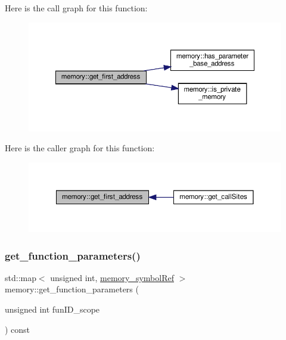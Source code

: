 Here is the call graph for this function\+:
\nopagebreak
\begin{figure}[H]
\begin{center}
\leavevmode
\includegraphics[width=350pt]{d8/d99/classmemory_a8288dc9efc8050b3d34cb06b74a1d3db_cgraph}
\end{center}
\end{figure}
Here is the caller graph for this function\+:
\nopagebreak
\begin{figure}[H]
\begin{center}
\leavevmode
\includegraphics[width=350pt]{d8/d99/classmemory_a8288dc9efc8050b3d34cb06b74a1d3db_icgraph}
\end{center}
\end{figure}
\mbox{\label{classmemory_a5d64e7ff7e95efad54bbfa07f58e18c1}} 
\subsubsection{\texorpdfstring{get\+\_\+function\+\_\+parameters()}{get\_function\_parameters()}}
{\footnotesize\ttfamily std\+::map$<$ unsigned int, \hyperlink{memory__symbol_8hpp_af3608dbc27177447c2d777fa712cc82a}{memory\+\_\+symbol\+Ref} $>$ memory\+::get\+\_\+function\+\_\+parameters (\begin{DoxyParamCaption}\item[{unsigned int}]{fun\+I\+D\+\_\+scope }\end{DoxyParamCaption}) const}




